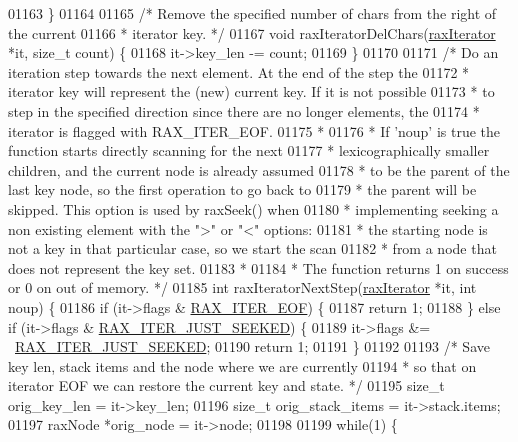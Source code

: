 \begin{DoxyCode}
{{{{{{{{{{{{{{{{{{01163 \}
01164 
01165 \textcolor{comment}{/* Remove the specified number of chars from the right of the current}
01166 \textcolor{comment}{ * iterator key. */}
01167 \textcolor{keywordtype}{void} raxIteratorDelChars(\hyperlink{structraxIterator}{raxIterator} *it, size\_t count) \{
01168     it->key\_len -= count;
01169 \}
01170 
01171 \textcolor{comment}{/* Do an iteration step towards the next element. At the end of the step the}
01172 \textcolor{comment}{ * iterator key will represent the (new) current key. If it is not possible}
01173 \textcolor{comment}{ * to step in the specified direction since there are no longer elements, the}
01174 \textcolor{comment}{ * iterator is flagged with RAX\_ITER\_EOF.}
01175 \textcolor{comment}{ *}
01176 \textcolor{comment}{ * If 'noup' is true the function starts directly scanning for the next}
01177 \textcolor{comment}{ * lexicographically smaller children, and the current node is already assumed}
01178 \textcolor{comment}{ * to be the parent of the last key node, so the first operation to go back to}
01179 \textcolor{comment}{ * the parent will be skipped. This option is used by raxSeek() when}
01180 \textcolor{comment}{ * implementing seeking a non existing element with the ">" or "<" options:}
01181 \textcolor{comment}{ * the starting node is not a key in that particular case, so we start the scan}
01182 \textcolor{comment}{ * from a node that does not represent the key set.}
01183 \textcolor{comment}{ *}
01184 \textcolor{comment}{ * The function returns 1 on success or 0 on out of memory. */}
01185 \textcolor{keywordtype}{int} raxIteratorNextStep(\hyperlink{structraxIterator}{raxIterator} *it, \textcolor{keywordtype}{int} noup) \{
01186     \textcolor{keywordflow}{if} (it->flags & \hyperlink{rax_8h_a4fb08a914b84ba0a39daa86297176e1c}{RAX\_ITER\_EOF}) \{
01187         \textcolor{keywordflow}{return} 1;
01188     \} \textcolor{keywordflow}{else} \textcolor{keywordflow}{if} (it->flags & \hyperlink{rax_8h_a665a029bbb4c6864ca2153b3ba3b746c}{RAX\_ITER\_JUST\_SEEKED}) \{
01189         it->flags &= ~\hyperlink{rax_8h_a665a029bbb4c6864ca2153b3ba3b746c}{RAX\_ITER\_JUST\_SEEKED};
01190         \textcolor{keywordflow}{return} 1;
01191     \}
01192 
01193     \textcolor{comment}{/* Save key len, stack items and the node where we are currently}
01194 \textcolor{comment}{     * so that on iterator EOF we can restore the current key and state. */}
01195     size\_t orig\_key\_len = it->key\_len;
01196     size\_t orig\_stack\_items = it->stack.items;
01197     raxNode *orig\_node = it->node;
01198 
01199     \textcolor{keywordflow}{while}(1) \{
}}}}}}}}}}}}}}}}}}
\end{DoxyCode}
